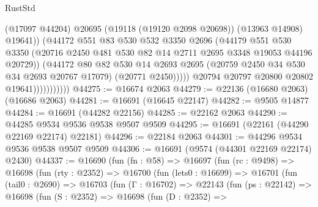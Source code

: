 \begin{lexlean}{RustStd}
\begin{coremodule}
                                  (@17097 @44204)
                                  @20695
                                  (@19118 (@19120 @2098 @20698))
                                  (@13963 @14908)
                                  @19641))
                              (@44172
                                @551
                                @83
                                @530
                                @532
                                @3350
                                @2696
                                (@44179
                                  @551
                                  @530
                                  @3350
                                  (@20716
                                    @2450
                                    @481
                                    @530
                                    @82
                                    @14
                                    @2711
                                    @2695
                                    @3348
                                    @19053
                                    @44196
                                    @20729))
                                (@44172
                                  @80
                                  @82
                                  @530
                                  @14
                                  @2693
                                  @2695
                                  (@20759 @2450 @34 @530 @34 @2693 @20767 @17079)
                                  (@20771 @2450)))))
                          @20794
                          @20797
                          @20800
                          @20802
                          @19641)))))))))))
@44275 := @16674 @2063
@44279 := @22136 (@16680 @2063) (@16686 @2063)
@44281 := @16691 (@16645 @22147)
@44282 := @9505 @14877
@44284 := @16691 (@44282 @22156)
@44285 := @22162 @2063
@44290 := @44285 @9534 @9536 @9538 @9507 @9509
@44295 := @16691 (@22161 (@44290 @22169 @22174) @22181)
@44296 := @22184 @2063
@44301 := @44296 @9534 @9536 @9538 @9507 @9509
@44306 := @16691 (@9574 (@44301 @22169 @22174) @2430)
@44337 := @16690
    (fun (fn : @58) =>
    @16697
      (fun (rc : @9498) =>
      @16698
        (fun (rty : @2352) =>
        @16700
          (fun (lets0 : @16699) =>
          @16701
            (fun (tail0 : @2690) =>
            @16703
              (fun (Γ : @16702) =>
              @22143
                (fun (ps : @22142) =>
                @16698
                  (fun (S : @2352) =>
                  @16698
                    (fun (D : @2352) =>

\end{coremodule}
\end{lexlean}
